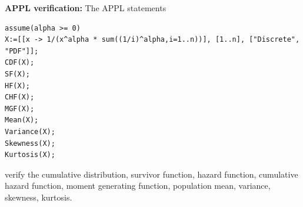 \documentclass[12pt,fullpage]{article}
\begin{document}
\newpage


\noindent
{\bf APPL verification:}
The APPL statements
\begin{verbatim}
assume(alpha >= 0)
X:=[[x -> 1/(x^alpha * sum((1/i)^alpha,i=1..n))], [1..n], ["Discrete", "PDF"]];
CDF(X);
SF(X);
HF(X);
CHF(X);
MGF(X);
Mean(X);
Variance(X);
Skewness(X);
Kurtosis(X);
\end{verbatim}
verify the cumulative distribution, survivor function, hazard function, cumulative hazard function, moment generating function, population mean, variance, skewness, kurtosis.
\end{document}
